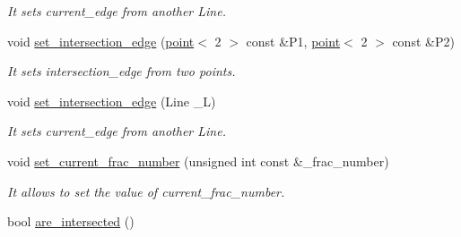 \begin{DoxyCompactItemize}
\begin{DoxyCompactList}\small\item\em It sets current\_\-edge from another Line. \item\end{DoxyCompactList}\item 
\hypertarget{classintersector__Formaggia_aa551c6b1c9fdc9ae7e52f1bc3e8e1b5f}{
void \hyperlink{classintersector__Formaggia_aa551c6b1c9fdc9ae7e52f1bc3e8e1b5f}{set\_\-intersection\_\-edge} (\hyperlink{classpoint}{point}$<$ 2 $>$ const \&P1, \hyperlink{classpoint}{point}$<$ 2 $>$ const \&P2)}
\label{classintersector__Formaggia_aa551c6b1c9fdc9ae7e52f1bc3e8e1b5f}

\begin{DoxyCompactList}\small\item\em It sets intersection\_\-edge from two points. \item\end{DoxyCompactList}\item 
\hypertarget{classintersector__Formaggia_a63a61dd850f5a5acae2c86bc78cf9ef1}{
void \hyperlink{classintersector__Formaggia_a63a61dd850f5a5acae2c86bc78cf9ef1}{set\_\-intersection\_\-edge} (Line \_\-L)}
\label{classintersector__Formaggia_a63a61dd850f5a5acae2c86bc78cf9ef1}

\begin{DoxyCompactList}\small\item\em It sets current\_\-edge from another Line. \item\end{DoxyCompactList}\item 
\hypertarget{classintersector__Formaggia_a1b7f9b1d99210fcfa9baf267f210715a}{
void \hyperlink{classintersector__Formaggia_a1b7f9b1d99210fcfa9baf267f210715a}{set\_\-current\_\-frac\_\-number} (unsigned int const \&\_\-frac\_\-number)}
\label{classintersector__Formaggia_a1b7f9b1d99210fcfa9baf267f210715a}

\begin{DoxyCompactList}\small\item\em It allows to set the value of current\_\-frac\_\-number. \item\end{DoxyCompactList}\item 
\hypertarget{classintersector__Formaggia_ad6210bafc4cbf652cffc78941c718c4b}{
bool \hyperlink{classintersector__Formaggia_ad6210bafc4cbf652cffc78941c718c4b}{are\_\-intersected} ()}
\label{classintersector__Formaggia_ad6210bafc4cbf652cffc78941c718c4b}


\end{DoxyCompactItemize}
